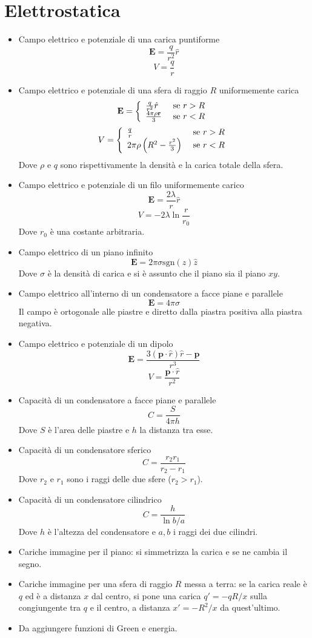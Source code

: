 \documentclass[a4paper,11pt]{book}
\renewcommand{\vec}[1]{\mathbf{#1}}
\theoremstyle{theorem}
\theoremstyle{definition}
\begin{document}
\section{Elettrostatica}
\begin{itemize}
	\item Campo elettrico e potenziale di una carica puntiforme
	\[\vec{E}=\frac{q}{r^2}\hat{r}\]
	\[V=\frac{q}{r}\]
	\item Campo elettrico e potenziale di una sfera di raggio $R$ uniformemente carica
	\[\vec{E}=\left\{\begin{array}{l l}
	\frac{q}{r^2}\hat{r} &\textrm{ se }r>R\\
	\frac{4\pi\rho \vec{r}}{3}&\textrm{ se }r<R
	\end{array}\right.\]
	\[V=\left\{\begin{array}{l l}
	\frac{q}{r} &\textrm{ se }r>R\\
	2\pi\rho\left(R^2-\frac{r^2}{3}\right)&\textrm{ se }r<R
	\end{array}\right.\]
	Dove $\rho$ e $q$ sono rispettivamente la densità e la carica totale della sfera.
	\item Campo elettrico e potenziale di un filo uniformemente carico
	\[\vec{E}=\frac{2\lambda}{r}\hat{r}\]
	\[V=-2\lambda\ln\frac{r}{r_0}\]
	Dove $r_0$ è una costante arbitraria.
	\item Campo elettrico di un piano infinito
	\[\vec{E}=2\pi\sigma\textrm{sgn}(z)\hat{z}\]
	Dove $\sigma$ è la densità di carica e si è assunto che il piano sia il piano $xy$.
	\item Campo elettrico all'interno di un condensatore a facce piane e parallele
	\[\vec{E}=4\pi\sigma\]
	Il campo è ortogonale alle piastre e diretto dalla piastra positiva alla piastra negativa.
	\item Campo elettrico e potenziale di un dipolo
	\[\vec{E}=\frac{3(\vec{p}\cdot\hat{r})\hat{r}-\vec{p}}{r^3}\]
	\[V=\frac{\vec{p}\cdot\hat{r}}{r^2}\]
	\item Capacità di un condensatore a facce piane e parallele
	\[C=\frac{S}{4\pi h}\]
	Dove $S$ è l'area delle piastre e $h$ la distanza tra esse.
	\item Capacità di un condensatore sferico
	\[C=\frac{r_2r_1}{r_2-r_1}\]
	Dove $r_2$ e $r_1$ sono i raggi delle due sfere ($r_2>r_1$).
	\item Capacità di un condensatore cilindrico
	\[C=\frac{h}{\ln b/a}\]
	Dove $h$ è l'altezza del condensatore e $a,b$ i raggi dei due cilindri.
	\item Cariche immagine per il piano: si simmetrizza la carica e se ne cambia il segno.
	\item Cariche immagine per una sfera di raggio $R$ messa a terra: se la carica reale è $q$ ed è a distanza $x$ dal centro, si pone una carica $q'=-qR/x$ sulla congiungente tra $q$ e il centro, a distanza $x'=-R^2/x$ da quest'ultimo.
	\item Da aggiungere funzioni di Green e energia.
\end{itemize}
\end{document}
